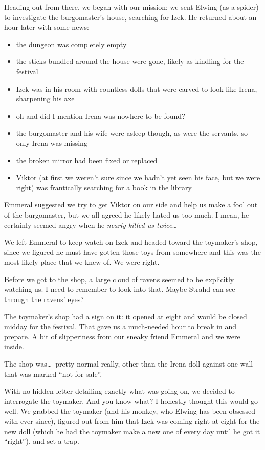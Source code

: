 Heading out from there, we began with our mission: we sent Elwing (as a spider) to investigate the burgomaster's house, searching for Izek. He returned about an hour later with some news:
\begin{itemize}
\item the dungeon was completely empty
\item the sticks bundled around the house were gone, likely as kindling for the festival
\item Izek was in his room with countless dolls that were carved to look like Irena, sharpening his axe
\item oh and did I mention Irena was nowhere to be found?
\item the burgomaster and his wife were asleep though, as were the servants, so only Irena was missing
\item the broken mirror had been fixed or replaced
\item Viktor (at first we weren't sure since we hadn't yet seen his face, but we were right) was frantically searching for a book in the library
\end{itemize}

Emmeral suggested we try to get Viktor on our side and help us make a fool out of the burgomaster, but we all agreed he likely hated us too much. I mean, he certainly seemed angry when he \emph{nearly killed us twice}\dots

We left Emmeral to keep watch on Izek and headed toward the toymaker's shop, since we figured he must have gotten those toys from somewhere and this was the most likely place that we knew of. We were right.

Before we got to the shop, a large cloud of ravens seemed to be explicitly watching us. I need to remember to look into that. Maybe Strahd can see through the ravens' eyes?

The toymaker's shop had a sign on it: it opened at eight and would be closed midday for the festival. That gave us a much-needed hour to break in and prepare. A bit of slipperiness from our sneaky friend Emmeral and we were inside.

The shop was\dots\ pretty normal really, other than the Irena doll against one wall that was marked ``not for sale''.

With no hidden letter detailing exactly what was going on, we decided to interrogate the toymaker. And you know what? I honestly thought this would go well. We grabbed the toymaker (and his monkey, who Elwing has been obsessed with ever since), figured out from him that Izek was coming right at eight for the new doll (which he had the toymaker make a new one of every day until he got it ``right''), and set a trap.

